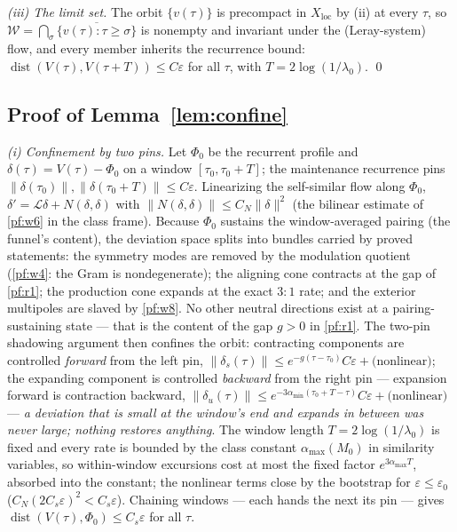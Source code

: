 \documentclass[11pt,letterpaper]{amsart}
\theoremstyle{definition}
\theoremstyle{remark}
\newcommand{\norm}[1]{\lVert #1 \rVert}
\begin{document}
\emph{(iii) The limit set.} The orbit $\{v(\tau)\}$ is precompact in
$X_{\mathrm{loc}}$ by (ii) at every $\tau$, so
$\mathcal{W}=\bigcap_\sigma\overline{\{v(\tau):\tau\ge\sigma\}}$ is nonempty and
invariant under the (Leray-system) flow, and every member inherits the recurrence
bound: $\operatorname{dist}(V(\tau),V(\tau+T))\le C\varepsilon$ for all $\tau$, with
$T=2\log(1/\lambda_0)$. \qed

\subsection{Proof of Lemma~\ref{lem:confine}}\label{pf:confine}
\emph{(i) Confinement by two pins.} Let $\Phi_0$ be the recurrent profile and
$\delta(\tau)=V(\tau)-\Phi_0$ on a window $[\tau_0,\tau_0+T]$; the maintenance
recurrence pins $\norm{\delta(\tau_0)},\norm{\delta(\tau_0+T)}\le C\varepsilon$.
Linearizing the self-similar flow along $\Phi_0$,
$\delta'=\mathcal{L}\delta+N(\delta,\delta)$ with
$\norm{N(\delta,\delta)}\le C_N\norm{\delta}^2$ (the bilinear estimate of
\cref{pf:w6} in the class frame). Because $\Phi_0$ sustains the window-averaged
pairing (the funnel's content), the deviation space splits into bundles carried by
proved statements: the symmetry modes are removed by the modulation quotient
(\cref{pf:w4}: the Gram is nondegenerate); the aligning cone contracts at the gap of
\cref{pf:r1}; the production cone expands at the exact $3{:}1$ rate; and the exterior
multipoles are slaved by \cref{pf:w8}. No other neutral directions exist at a
pairing-sustaining state --- that is the content of the gap $g>0$ in \cref{pf:r1}.
The two-pin shadowing argument then confines the orbit: contracting components are
controlled \emph{forward} from the left pin,
$\norm{\delta_s(\tau)}\le e^{-g(\tau-\tau_0)}C\varepsilon+\text{(nonlinear)}$; the
expanding component is controlled \emph{backward} from the right pin --- expansion
forward is contraction backward,
$\norm{\delta_u(\tau)}\le e^{-3\alpha_{\min}(\tau_0+T-\tau)}C\varepsilon
+\text{(nonlinear)}$ --- \emph{a deviation that is small at the window's end and
expands in between was never large; nothing restores anything}. The window length
$T=2\log(1/\lambda_0)$ is fixed and every rate is bounded by the class constant
$\alpha_{\max}(M_0)$ in similarity variables, so within-window excursions cost at
most the fixed factor $e^{3\alpha_{\max}T}$, absorbed into the constant; the
nonlinear terms close by the bootstrap for $\varepsilon\le\varepsilon_0$
($C_N(2C_s\varepsilon)^2<C_s\varepsilon$). Chaining windows --- each hands the next
its pin --- gives $\operatorname{dist}(V(\tau),\Phi_0)\le C_s\varepsilon$ for all
$\tau$.
\end{document}
